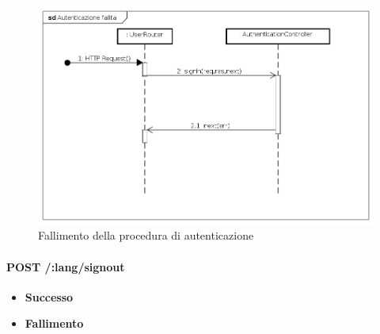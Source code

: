 \begin{itemize}
\label{Fallimento della procedura di autenticazione}
\begin{figure}[ht]
	\centering
	\includegraphics[scale=0.40]{UML/DiagrammiDiSequenza/Back-end/POST__lang_signin_failure.png}
	\caption{Fallimento della procedura di autenticazione}
\end{figure}
\FloatBarrier

\end{itemize}

\paragraph{POST /:lang/signout}
\begin{itemize}
\item \textbf{Successo}
\item \textbf{Fallimento}
\end{itemize}

